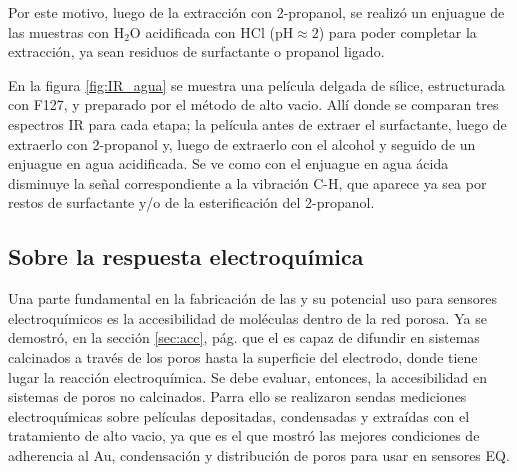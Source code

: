 			
		Por este motivo, luego de la extracción con 2-propanol, se realizó un enjuague de las muestras con H$_2$O acidificada con HCl (pH$\approx 2$) para poder completar la extracción, ya sean residuos de surfactante o propanol ligado.
				
		En la figura \ref{fig:IR_agua} se muestra una película delgada de sílice, estructurada con F127, y preparado por el método de alto vacio. Allí donde se comparan tres espectros IR para cada etapa; la película antes de extraer el surfactante, luego de extraerlo con 2-propanol y, luego de extraerlo con el alcohol y seguido de un enjuague en agua acidificada. Se ve como con el enjuague en agua ácida disminuye la señal correspondiente a la vibración C-H, que aparece ya sea por restos de surfactante y/o de la esterificación del 2-propanol.

	\subsection{Sobre la respuesta electroquímica}\label{sec:acc_eq}

	  Una parte fundamental en la fabricación de las \pdm\space y su potencial uso para sensores electroquímicos es la accesibilidad de moléculas dentro de la red porosa. Ya se demostró, en la sección \ref{sec:acc}, pág. \pageref{sec:acc} que el \aminorutenio\space es capaz de difundir en sistemas calcinados a través de los poros hasta la superficie del electrodo, donde tiene lugar la reacción electroquímica. Se debe evaluar, entonces,  la accesibilidad en sistemas de poros no calcinados. Parra ello se realizaron sendas mediciones electroquímicas sobre películas depositadas, condensadas y extraídas con el tratamiento de alto vacio, ya que es el que mostró las mejores condiciones de adherencia al Au, condensación y distribución de poros para usar en sensores EQ. 

